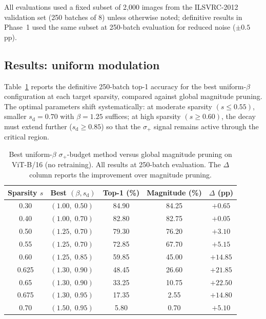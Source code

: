 \documentclass[11pt]{article}
\theoremstyle{plain}
\theoremstyle{definition}
\theoremstyle{remark}
\newcommand{\1}{\mathbf{1}}
\begin{document}
All evaluations used a fixed subset of 2{,}000 images from the ILSVRC-2012 validation set (250 batches of 8) unless otherwise noted; definitive results in Phase~1 used the same subset at 250-batch evaluation for reduced noise (\(\pm 0.5\) pp).

\subsection{Results: uniform modulation}
\label{subsec:uniform_results}

Table~\ref{tab:splus_uniform} reports the definitive 250-batch top-1 accuracy for the best uniform-\(\beta\) configuration at each target sparsity, compared against global magnitude pruning.  The optimal parameters shift systematically: at moderate sparsity \((s\le 0.55)\), smaller \(s_{\mathrm{d}}=0.70\) with \(\beta=1.25\) suffices; at high sparsity \((s\ge 0.60)\), the decay must extend further (\(s_{\mathrm{d}}\ge 0.85\)) so that the \(\sigma_+\) signal remains active through the critical region.

\begin{table}[ht]
\centering
\caption{Best uniform-\(\beta\) \(\sigma_+\)-budget method versus global magnitude pruning on ViT-B/16 (no retraining).  All results at 250-batch evaluation.  The \(\Delta\) column reports the improvement over magnitude pruning.}
\label{tab:splus_uniform}
\begin{tabular}{clccc}
\toprule
Sparsity \(s\) & Best \((\beta, s_{\mathrm{d}})\) & Top-1 (\%) & Magnitude (\%) & \(\Delta\) (pp) \\
\midrule
0.30 & \((1.00,\;0.50)\) & 84.90 & 84.25 & \(+0.65\) \\
0.40 & \((1.00,\;0.70)\) & 82.80 & 82.75 & \(+0.05\) \\
0.50 & \((1.25,\;0.70)\) & 79.30 & 76.20 & \(+3.10\) \\
0.55 & \((1.25,\;0.70)\) & 72.85 & 67.70 & \(+5.15\) \\
0.60 & \((1.25,\;0.85)\) & 59.85 & 45.00 & \(+14.85\) \\
0.625 & \((1.30,\;0.90)\) & 48.45 & 26.60 & \(+21.85\) \\
0.65 & \((1.30,\;0.90)\) & 33.25 & 10.75 & \(+22.50\) \\
0.675 & \((1.30,\;0.95)\) & 17.35 & 2.55 & \(+14.80\) \\
0.70 & \((1.50,\;0.95)\) & 5.80 & 0.70 & \(+5.10\) \\
\bottomrule
\end{tabular}
\end{table}
\end{document}
